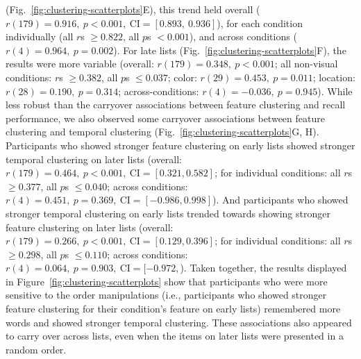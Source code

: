 \documentclass[11pt]{article}
\begin{document}
(Fig.~\ref{fig:clustering-scatterplots}E), this trend held overall ($r(179) =
0.916,~p < 0.001,~\mathrm{CI} = [0.893,~0.936]$), for each condition
individually (all $r$s $\geq 0.822$, all $p$s $< 0.001$), and across conditions
($r(4) = 0.964,~p = 0.002$). For late lists
(Fig.~\ref{fig:clustering-scatterplots}F), the results were more variable
(overall: $r(179) = 0.348,~p < 0.001$; all non-visual conditions: $r$s $\geq
0.382$, all $p$s $\leq 0.037$; color: $r(29) = 0.453,~p = 0.011$; location: $
r(28) = 0.190,~p = 0.314$; across-conditions: $r(4) = -0.036,~p = 0.945$).
While less robust than the carryover associations between feature clustering
and recall performance, we also observed some carryover associations between
feature clustering and temporal clustering
(Fig.~\ref{fig:clustering-scatterplots}G, H). Participants who showed stronger
feature clustering on early lists showed stronger temporal
clustering on later lists (overall: $r(179) = 0.464,~p < 0.001,~\mathrm{CI} =
[0.321, 0.582]$; for individual conditions: all $r$s $\geq 0.377$, all $p$s
$\leq 0.040$; across conditions: $ r(4) = 0.451,~p = 0.369,~\mathrm{CI} =
[-0.986, 0.998]$). And participants who showed stronger temporal clustering on
early lists trended towards showing stronger feature clustering on later lists
(overall: $r(179) = 0.266,~p < 0.001,~\mathrm{CI} = [0.129, 0.396]$; for
individual conditions: all $r$s $\geq 0.298$, all $p$s $\leq 0.110$; across
conditions: $r(4) = 0.064,~p = 0.903,~\mathrm{CI} = [-0.972,$). Taken together,
the results displayed in Figure~\ref{fig:clustering-scatterplots} show that
participants who were more sensitive to the order manipulations (i.e.,
participants who showed stronger feature clustering for their condition's
feature on early lists) remembered more words and showed stronger temporal
clustering. These associations also appeared to carry over across lists, even
when the items on later lists were presented in a random order.
\end{document}
